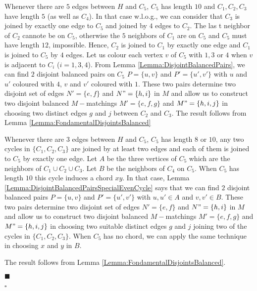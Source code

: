 \documentclass{elsart}
\theoremstyle{plain} \theoremheaderfont{\scshape}
\newenvironment{Prf}{{\bf \noindent Proof } }{\hfill$\square$\\}
\newenvironment{PrfClaim}{{\bf Proof }}{{\hfill\tiny{$\blacksquare$\\}}}
\begin{document}
\begin{Prf}
\begin{PrfClaim}
Whenever there are $5$ edges between $H$ and $C_5$, $C_5$ has length
$10$ and $C_1,C_2,C_3$ have length $5$ (as well as $C_4$). In that
case w.l.o.g., we can consider that $C_3$ is joined by exactly one
edge to $C_5$ and joined by $4$ edges to $C_2$. The las t neighbor
of $C_2$ cannote be on $C_5$, otherwise the $5$ neighbors of $C_1$
are on $C_5$ and $C_5$ must have length $12$, impossible. Hence,
$C_2$ is joined to $C_1$ by exactly one edge and $C_1$ is joined to
$C_5$ by $4$ edges. Let us colour each vertex $v$ of $C_5$ with
$1,3$ or $4$ when $v$ is adjacent to $C_i$ ($i=1,3,4$). From Lemma
\ref{Lemma:DisjointBalancedPairs}, we can find $2$ disjoint balanced
pairs on $C_5$ $P=\{u,v\}$ and $P'=\{u',v'\}$ with $u$ and $u'$
coloured with $4$, $v$ and $v'$ coloured with $1$. These two pairs
determine two disjoint set of edges $N'=\{e,f\}$ and $N"=\{h,i\}$ in
$M$ and allow us to construct two disjoint balanced $M-$matchings
$M'=\{e,f,g\}$ and $M"=\{h,i,j\}$ in choosing two distinct edges $g$
and $j$ between $C_2$ and $C_3$. The result follows from Lemma
\ref{Lemma:FondamentalDisjointsBalanced}




Whenever there are $3$ edges between $H$ and $C_5$, $C_5$ has length
$8$ or $10$, any two cycles in $\{C_1,C_2,C_3\}$ are joined by at
least two edges and  each of them is joined to $C_5$ by exactly one
edge. Let $A$ be the three vertices of $C_5$ which are the neighbors
of $C_1 \cup C_2 \cup C_3$. Let $B$ be the neighbors of $C_4$ on
$C_5$. When $C_5$ has length $10$ this cycle induces a  chord $xy$.
In that case, Lemma
\ref{Lemma:DisjointBalancedPairsSpecialEvenCycle} says that we can
find $2$ disjoint balanced pairs $P=\{u,v\}$ and $P'=\{u',v'\}$ with
$u,u' \in A$  and  $v,v' \in B$. These two pairs determine two
disjoint set of edges $N'=\{e,f\}$ and $N"=\{h,i\}$ in $M$ and allow
us to construct two disjoint balanced $M-$matchings $M'=\{e,f,g\}$
and $M"=\{h,i,j\}$ in choosing two suitable distinct edges $g$ and
$j$ joining two of the cycles in $\{C_1,C_2,C_3\}$. When $C_5$ has
no chord, we can apply the same technique in choosing $x$ and $y$ in
$B$.

The result follows from Lemma
\ref{Lemma:FondamentalDisjointsBalanced}.

\end{PrfClaim}


\end{Prf}
\end{document}
